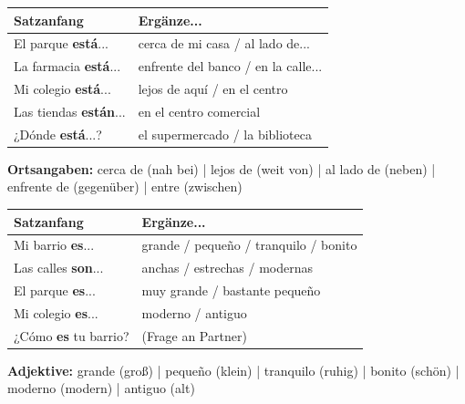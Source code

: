 \documentclass[11pt, a4paper]{article}
\begin{document}
\begin{tcolorbox}[
    colback=gruppeA!10,
    colframe=gruppeA,
    title={\color{white}\bfseries ESTAR -- Wo ist...? (Lage)},
    fonttitle=\bfseries
]

\renewcommand{\arraystretch}{1.5}
\begin{tabular}{@{}p{9cm}p{7.5cm}@{}}
\textbf{Satzanfang} & \textbf{Ergänze...} \\
\hline
El parque \textbf{está}... & cerca de mi casa / al lado de... \\
La farmacia \textbf{está}... & enfrente del banco / en la calle... \\
Mi colegio \textbf{está}... & lejos de aquí / en el centro \\
Las tiendas \textbf{están}... & en el centro comercial \\
¿Dónde \textbf{está}...? & el supermercado / la biblioteca \\
\end{tabular}

\vspace{0.2cm}
\footnotesize\textbf{Ortsangaben:} cerca de (nah bei) | lejos de (weit von) | al lado de (neben) | enfrente de (gegenüber) | entre (zwischen)

\end{tcolorbox}

\vspace{0.3cm}


\begin{tcolorbox}[
    colback=gruppeA!10,
    colframe=gruppeA,
    title={\color{white}\bfseries SER -- Wie ist...? (Beschreibung)},
    fonttitle=\bfseries
]

\renewcommand{\arraystretch}{1.5}
\begin{tabular}{@{}p{9cm}p{7.5cm}@{}}
\textbf{Satzanfang} & \textbf{Ergänze...} \\
\hline
Mi barrio \textbf{es}... & grande / pequeño / tranquilo / bonito \\
Las calles \textbf{son}... & anchas / estrechas / modernas \\
El parque \textbf{es}... & muy grande / bastante pequeño \\
Mi colegio \textbf{es}... & moderno / antiguo \\
¿Cómo \textbf{es} tu barrio? & (Frage an Partner) \\
\end{tabular}

\vspace{0.2cm}
\footnotesize\textbf{Adjektive:} grande (groß) | pequeño (klein) | tranquilo (ruhig) | bonito (schön) | moderno (modern) | antiguo (alt)

\end{tcolorbox}
\end{document}
